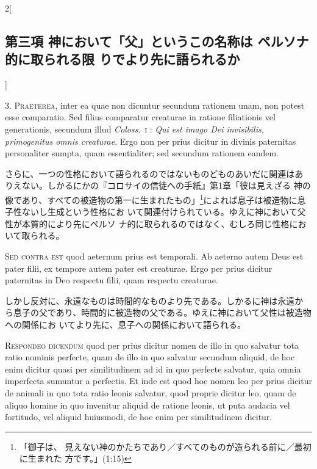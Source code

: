 \documentclass[paper=a4paper,fontsize=10pt,jafontsize=9pt,titlepage]{jlreq}
\begin{document}
\begin{paracol}{2}[\subsection{第三項 神において「父」というこの名称は ペルソナ的に取られる限 りでより先に語られるか}]


3. {\scshape Praeterea}, inter ea quae non dicuntur secundum rationem unam, non
potest esse comparatio. Sed filius comparatur creaturae in ratione
filiationis vel generationis, secundum illud {\itshape
 Coloss}.~{\scshape i} : {\itshape Qui est imago
Dei invisibilis, primogenitus omnis creaturae}. Ergo non per prius
dicitur in divinis paternitas personaliter sumpta, quam essentialiter;
sed secundum rationem eandem.


\switchcolumn


さらに、一つの性格において語られるのではないものどものあいだに関連はあ
 りえない。しかるにかの『コロサイの信徒への手紙』第1章「彼は見えざる
 神の像であり、すべての被造物の第一に生まれたもの」\footnote{「御子は、
 見えない神のかたちであり／すべてのものが造られる前に／最初に生まれた
 方です。」(1:15)}によれば息子は被造物に息子性ないし生成という性格にお
 いて関連付けられている。ゆえに神において父性が本質的により先にペルソ
 ナ的に取られるのではなく、むしろ同じ性格において取られる。


\switchcolumn*[\subsection{s.c.}]


{\scshape Sed contra est} quod aeternum prius est temporali. Ab aeterno autem
Deus est pater filii, ex tempore autem pater est creaturae. Ergo per
prius dicitur paternitas in Deo respectu filii, quam respectu
creaturae.


\switchcolumn


しかし反対に、永遠なものは時間的なものより先である。しかるに神は永遠か
 ら息子の父であり、時間的に被造物の父である。ゆえに神において父性は被造物への関係にお
 いてより先に、息子への関係において語られる。




{\scshape Respondeo dicendum} quod per prius dicitur nomen de illo in quo
salvatur tota ratio nominis perfecte, quam de illo in quo salvatur
secundum aliquid, de hoc enim dicitur quasi per similitudinem ad id in
quo perfecte salvatur, quia omnia imperfecta sumuntur a perfectis. Et
inde est quod hoc nomen leo per prius dicitur de animali in quo tota
ratio leonis salvatur, quod proprie dicitur leo, quam de aliquo homine
in quo invenitur aliquid de ratione leonis, ut puta audacia vel
fortitudo, vel aliquid huiusmodi, de hoc enim per similitudinem
dicitur.



\end{paracol}
\end{document}
